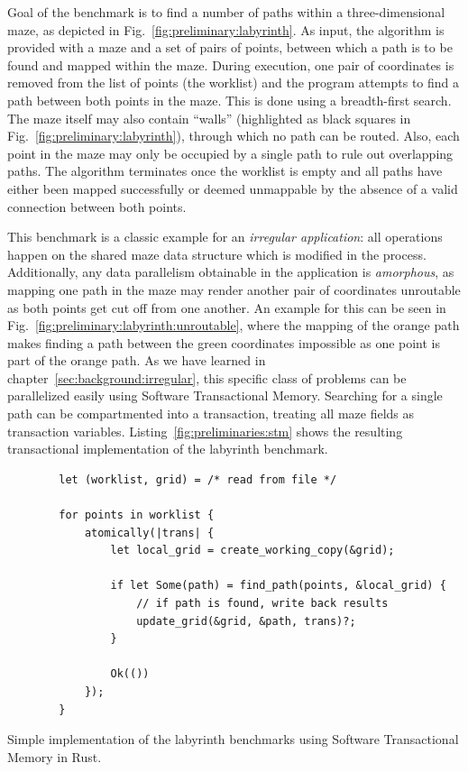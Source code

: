 Goal of the benchmark is to find a number of paths within a three-dimensional maze, as depicted in Fig.~\ref{fig:preliminary:labyrinth}.
As input, the algorithm is provided with a maze and a set of pairs of points, between which a path is to be found and mapped within the maze.
During execution, one pair of coordinates is removed from the list of points (the worklist) and the program attempts to find a path between both points in the maze.
This is done using a breadth-first search.
The maze itself may also contain \enquote{walls} (highlighted as black squares in Fig.~\ref{fig:preliminary:labyrinth}), through which no path can be routed.
Also, each point in the maze may only be occupied by a single path to rule out overlapping paths.
The algorithm terminates once the worklist is empty and all paths have either been mapped successfully or deemed unmappable by the absence of a valid connection between both points.

This benchmark is a classic example for an \emph{irregular application}: all operations happen on the shared maze data structure which is modified in the process.
Additionally, any data parallelism obtainable in the application is \emph{amorphous}, as mapping one path in the maze may render another pair of coordinates unroutable as both points get cut off from one another.
An example for this can be seen in Fig.~\ref{fig:preliminary:labyrinth:unroutable}, where the mapping of the orange path makes finding a path between the green coordinates impossible as one point is part of the orange path.
As we have learned in chapter~\ref{sec:background:irregular}, this specific class of problems can be parallelized easily using Software Transactional Memory.
Searching for a single path can be compartmented into a transaction, treating all maze fields as transaction variables.
Listing~\ref{fig:preliminaries:stm} shows the resulting transactional implementation of the labyrinth benchmark.

\begin{listing}[t]
    \begin{verbatim}
        let (worklist, grid) = /* read from file */

        for points in worklist {
            atomically(|trans| {
                let local_grid = create_working_copy(&grid);

                if let Some(path) = find_path(points, &local_grid) {
                    // if path is found, write back results
                    update_grid(&grid, &path, trans)?;
                }

                Ok(())
            });
        }
    \end{verbatim}
    \caption{Simple implementation of the labyrinth benchmarks using Software Transactional Memory in Rust.}%
    \label{fig:preliminaries:stm}
\end{listing}

